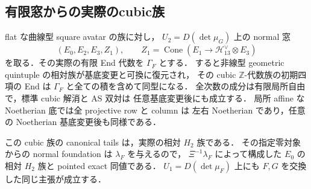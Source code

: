 \subsection{有限窓からの実際のcubic族}

\begin{proposition}[avatarのnormal窓からの相対cubic代数族]
\label{prop:qa-relative-cubic-from-avatar-window}
flat な曲線型 square avatar の族に対し，
$U_2=D(\det\mu_G)$ 上の normal 窓
\[
 (E_0,E_2,E_3,Z_1),\qquad
 Z_1=\operatorname{Cone}
   (E_1\to\mathcal H_{13}^{\vee}\otimes E_3)
\]
を取る．その実際の有限 End 代数を $\Gamma_F$ とする．
すると非線型 geometric quintuple の相対族が基底変更と可換に復元され，
その cubic $\mathbb Z$-代数族の初期四項の End は
$\Gamma_F$ と全ての積を含めて同型になる．
全次数の成分は有限局所自由で，標準 cubic 解消と AS 双対は
任意基底変更後にも成立する．
局所 affine な Noetherian 底では全 projective row と column は
左右 Noetherian であり，任意の Noetherian 基底変更後も同様である．

この cubic 族の canonical tails は，実際の相対 $H_2$ 族である．
その指定零対象からの normal foundation は $\lambda_F$ を与えるので，
$\Xi^{-1}\lambda_F$ によって構成した $E_0$ の相対 $H_2$ 族と
pointed exact 同値である．
$U_1=D(\det\mu_F)$ 上にも $F,G$ を交換した同じ主張が成立する．
\end{proposition}
